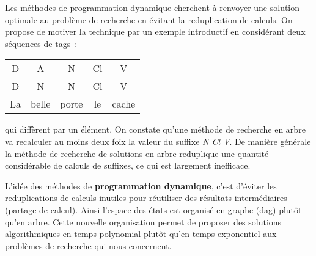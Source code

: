 \documentclass[11pt,openany]{book}
\newcommand{\ac}[1]{{\sc #1}} %
\newcommand{\kw}[1]{{\bf #1}} %
\begin{document}
Les méthodes de programmation dynamique cherchent à renvoyer une
solution optimale au problème de recherche en évitant la reduplication
de calculs. On propose de motiver la technique par un exemple introductif
en considérant deux séquences de tags~:
\begin{center}
\begin{tabular}{ccccc}\toprule
D &A& N& Cl& V\\
D& N& N& Cl& V\\\midrule
La&belle&porte&le&cache\\\bottomrule
\end{tabular}
\end{center}
qui diffèrent par un élément.  On constate qu'une méthode de recherche
en arbre va recalculer au moins deux foix la valeur du suffixe {\sl N Cl V}. 
De manière générale la méthode de recherche de solutions en arbre reduplique une quantité considérable de calculs de suffixes, ce qui est largement inefficace.
\begin{center}
\end{center}
L'idée des méthodes de \kw{programmation dynamique}, c'est d'éviter les reduplications de calculs inutiles pour réutiliser des résultats intermédiaires (partage de calcul). Ainsi l'espace des états est organisé en  graphe (\ac{dag}) plutôt qu'en arbre. Cette nouvelle organisation permet de proposer des solutions algorithmiques en temps polynomial plutôt qu'en temps exponentiel aux problèmes de recherche qui nous concernent.
\end{document}
